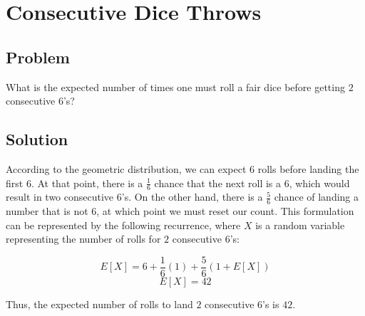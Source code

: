 \documentclass{article}
\date{}
\author{Kaan Aksoy | April 28, 2020}
\title{}
\begin{document}
\maketitle
\section{Consecutive Dice Throws}
\subsection{Problem}

What is the expected number of times one must roll a fair dice before 
getting $2$ consecutive $6$'s?

\subsection{Solution}
According to the geometric distribution, we can expect $6$ rolls before 
landing the first $6$. At that point, there is a $\frac{1}{6}$ chance 
that the next roll is a $6$, which would result in two consecutive $6$'s. 
On the other hand, there is a $\frac{5}{6}$ chance of landing a number that is 
not $6$, at which point we must reset our count. This formulation can be 
represented by the following recurrence, where $X$ is a random variable 
representing the number of rolls for $2$ consecutive $6$'s:

$$E[X] = 6 + \frac{1}{6}(1) + \frac{5}{6}(1+E[X])$$
$$E[X] = 42$$

Thus, the expected number of rolls to land $2$ consecutive $6$'s is $42$.
\end{document}
